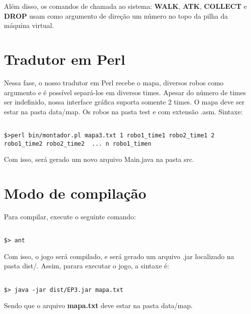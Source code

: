 \documentclass[11pt]{article}
\begin{document}
Além disso, os comandos de chamada ao sistema: \textbf{WALK}, \textbf{ATK}, \textbf{COLLECT} e \textbf{DROP} usam como argumento de direção um número no topo da pilha da máquina virtual.







\section{Tradutor em Perl}

Nessa fase, o nosso tradutor em Perl recebe o mapa, diversos robos como argumento e é possível separá-los em diversos times. Apesar do número de times ser indefinido, nossa interface gráfica suporta somente 2 times. O mapa deve ser estar na pasta data/map. Os robos na pasta test e com extensão .asm.
Sintaxe:

\begin{verbatim}

$>perl bin/montador.pl mapa3.txt 1 robo1_time1 robo2_time1 2 robo1_time2 robo2_time2  ... n robo1_timen

\end{verbatim}

Com isso, será gerado um novo arquivo Main.java na pasta src.

\section{Modo de compilação}

Para compilar, execute o seguinte comando:

\begin{verbatim}

$> ant

\end{verbatim}

Com isso, o jogo será compilado, e será gerado um arquivo .jar localizado na pasta dist/. Assim, parara executar o jogo, a sintaxe é:

\begin{verbatim}

$> java -jar dist/EP3.jar mapa.txt

\end{verbatim}

Sendo que o arquivo \textbf{\color{red}mapa.txt} deve estar na pasta data/map.
\end{document}
